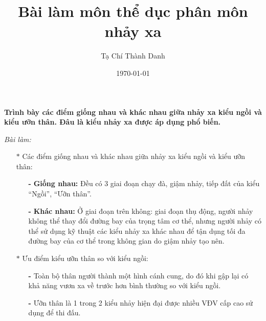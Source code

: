 \documentclass[12pt,a4paper,notitlepage]{article}
\author{Tạ Chí Thành Danh}
\date{\today}
\title{Bài làm môn thể dục phân môn nhảy xa}
\begin{document}
\maketitle
\begin{center}
	\textbf{Trình bày các điểm giống nhau và khác nhau giữa nhảy xa kiểu ngồi và kiểu ưỡn thân. 
		Đâu là kiểu nhảy xa được áp dụng phổ biến.}  
\end{center}
\begin{center}
	\textit{Bài làm:}
\end{center}
\begin{itemize}
	\item[$\ast$] Các điểm giống nhau và khác nhau giữa nhảy xa kiểu ngồi và kiểu ưỡn thân:
	\begin{itemize}
		\item[\textbf{-}] \textbf{Giống nhau:} Đều có 3 giai đoạn chạy đà, giậm nhảy, tiếp đất của kiểu “Ngồi”, “Ưỡn thân”.
		\item[\textbf{-}] \textbf{Khác nhau:} Ở giai đoạn trên không: giai đoạn thụ động, người nhảy không thể thay đổi đường bay của trọng tâm cơ thể, nhưng người nhảy có thể sử dụng kỹ thuật các kiểu nhảy xa khác nhau để tận dụng tối đa đường bay của cơ thể trong không gian do giậm nhảy tạo nên.
	\end{itemize}

	\item[$\ast$]Ưu điểm kiểu ưỡn thân so với kiểu ngồi:
	\begin{itemize}
		\item[\textbf{-}] Toàn bộ thân người thành một hình cánh cung, do đó khi gập lại có khả năng vươn xa về trước hơn bình thường so với kiểu ngồi.
		\item[\textbf{-}] Ưỡn thân là 1 trong 2 kiểu nhảy hiện đại được nhiều VĐV cấp cao sử dụng để thi đấu.
	\end{itemize}	
\end{itemize}	
\end{document}
